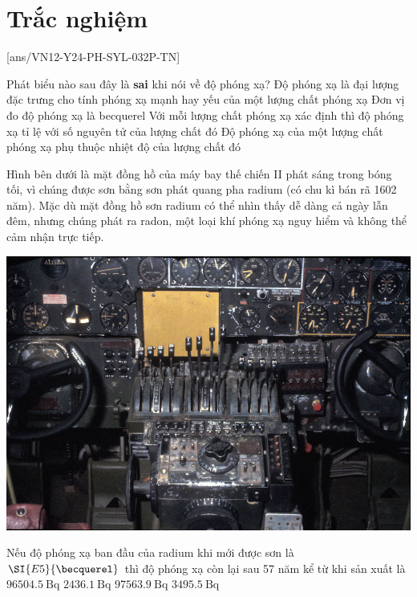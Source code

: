 \let\lesson\undefined
\newcommand{\lesson}{\phantomlesson{Bài 17.}}
\let\lesson\undefined
\newcommand{\lesson}{\phantomlesson{Bài 17.}}


\setcounter{section}{2}
\section{Trắc nghiệm}
[ans/VN12-Y24-PH-SYL-032P-TN]
\setcounter{ex}{0}
\begin{ex}
	 Phát biểu nào sau đây là \textbf{sai} khi nói về độ phóng xạ?
	\choice
	{Độ phóng xạ là đại lượng đặc trưng cho tính phóng xạ mạnh hay yếu của một lượng chất phóng xạ}
	{Đơn vị đo độ phóng xạ là becquerel}
	{Với mỗi lượng chất phóng xạ xác định thì độ phóng xạ tỉ lệ với số nguyên tử của lượng chất đó}
	{\True Độ phóng xạ của một lượng chất phóng xạ phụ thuộc nhiệt độ của lượng chất đó}
	\loigiai{}
\end{ex}
\begin{ex}
	Hình bên dưới là mặt đồng hồ của máy bay thế chiến II phát sáng trong bóng tối, vì chúng được sơn bằng sơn phát quang pha radium (có chu kì bán rã 1602 năm). Mặc dù mặt đồng hồ sơn radium có thể nhìn thấy dễ dàng cả ngày lẫn đêm, nhưng chúng phát ra radon, một loại khí phóng xạ nguy hiểm và không thể cảm nhận trực tiếp. 
	\begin{center}
		\includegraphics[width=0.4\linewidth]{../figs/VN12-Y24-PH-SYL-032P-1}
	\end{center}
	Nếu độ phóng xạ ban đầu của radium khi mới được sơn là $\SI{E5}{\becquerel}$ thì độ phóng xạ còn lại sau 57 năm kể từ khi sản xuất là
	\choice
	{$\SI{96504.5}{\becquerel}$}
	{$\SI{2436.1}{\becquerel}$}
	{\True $\SI{97563.9}{\becquerel}$}
	{$\SI{3495.5}{\becquerel}$}
\end{ex}
